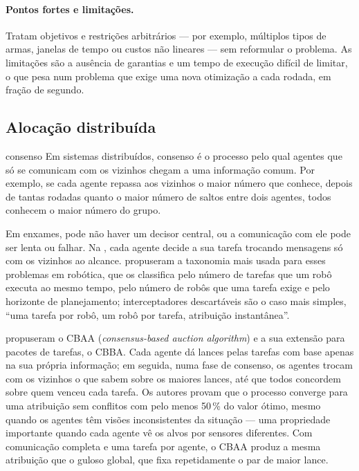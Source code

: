 \paragraph{Pontos fortes e limitações.} Tratam objetivos e restrições arbitrários --- por exemplo, múltiplos tipos de
armas, janelas de tempo ou custos não lineares --- sem reformular o problema. As limitações são a ausência de garantias e
um tempo de execução difícil de limitar, o que pesa num problema que exige uma nova otimização a cada rodada, em fração de
segundo.

\subsection{Alocação distribuída}\label{sec:rev_distrib}

\begin{conceitobox}{consenso}
Em sistemas distribuídos, consenso é o processo pelo qual agentes que só se comunicam com os vizinhos chegam a uma
informação comum. Por exemplo, se cada agente repassa aos vizinhos o maior número que conhece, depois de tantas rodadas
quanto o maior número de saltos entre dois agentes, todos conhecem o maior número do grupo.
\end{conceitobox}

Em enxames, pode não haver um decisor central, ou a comunicação com ele pode ser lenta ou falhar. Na
, cada agente decide a sua tarefa trocando mensagens só com os vizinhos ao alcance.
\citet{gerkey2004} propuseram a taxonomia mais usada para esses problemas em robótica, que os classifica pelo número de
tarefas que um robô executa ao mesmo tempo, pelo número de robôs que uma tarefa exige e pelo horizonte de planejamento;
interceptadores descartáveis são o caso mais simples, ``uma tarefa por robô, um robô por tarefa, atribuição instantânea''.

\citet{choi2009} propuseram o CBAA (\emph{consensus-based auction algorithm}) e a sua extensão para pacotes de tarefas, o
CBBA. Cada agente dá lances pelas tarefas com base apenas na sua própria informação; em seguida, numa fase de consenso, os
agentes trocam com os vizinhos o que sabem sobre os maiores lances, até que todos concordem sobre quem venceu cada
tarefa. Os autores provam que o processo converge para uma atribuição sem conflitos com pelo menos 50\,\% do valor ótimo,
mesmo quando os agentes têm visões inconsistentes da situação --- uma propriedade importante quando cada agente vê os alvos
por sensores diferentes. Com comunicação completa e uma tarefa por agente, o CBAA produz a mesma atribuição que o guloso
global, que fixa repetidamente o par de maior lance.

